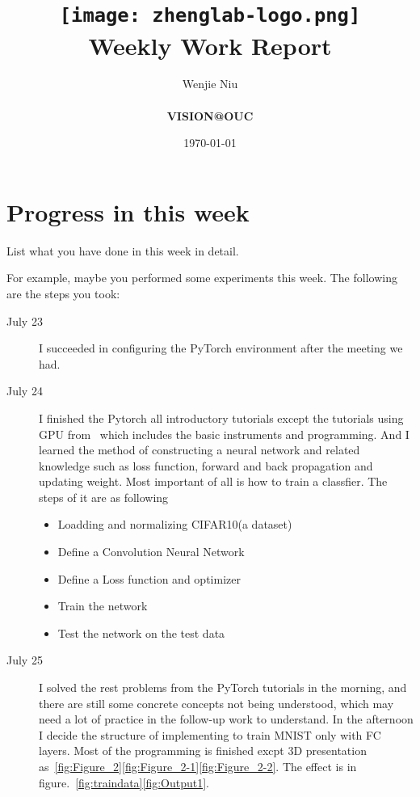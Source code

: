 \documentclass[a4paper]{article}
\title{
    \vspace*{1in}
    \texttt{[image: zhenglab-logo.png]} \\
    \vspace*{1.2in}
    \textbf{\huge Weekly Work Report}
    \vspace{0.2in}
}
\author{Wenjie Niu \\
    \vspace*{0.5in} \\
    \textbf{VISION@OUC} \\
    \vspace*{1in}
}
\date{\today}
\begin{document}
\maketitle
\setcounter{page}{0}
\thispagestyle{empty}
\newpage


\section{Progress in this week}

List what you have done in this week in detail.

For example, maybe you performed some experiments this week. The following are the steps you took:

\begin{description}
\item [July 23]\par
I succeeded in configuring the PyTorch environment after the meeting we had.
\item[July 24]\par
 I finished the Pytorch all introductory tutorials except the tutorials using GPU from~\cite{Pytorch} which includes the basic instruments and programming. And I learned the method of constructing a neural network and related knowledge such as loss function, forward and back propagation and  updating weight. Most important of all is how to train a classfier. The steps of it are as following
 \begin{itemize}
 	\item Loadding and normalizing CIFAR10(a dataset)
 	\item Define a Convolution Neural Network
 	\item Define a Loss function and optimizer
 	\item Train the network
 	\item Test the network on the test data
 \end{itemize}
\item[July 25]\par
I solved the rest problems from the PyTorch tutorials in the morning, and there are still some concrete concepts not being understood, which may need a lot of practice in the follow-up work to understand.
In the afternoon I decide the structure of implementing to train MNIST only with FC layers. Most of the programming is finished excpt 3D presentation as~\ref{fig:Figure_2}\ref{fig:Figure_2-1}\ref{fig:Figure_2-2}. The effect is in figure.~\ref{fig:traindata}\ref{fig:Output1}.\par


\end{description}
\end{document}
